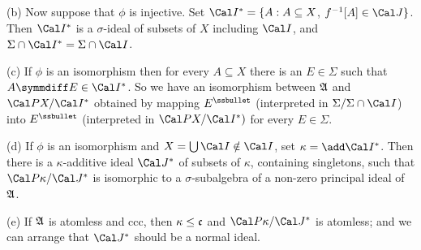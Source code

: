 (b) Now suppose that $\phi$ is injective.   Set
$\Cal I^*=\{A:A\subseteq X$, $f^{-1}[A]\in\Cal J\}$.  Then $\Cal I^*$ is a
$\sigma$-ideal of subsets of $X$ including $\Cal I$,
and $\Sigma\cap\Cal I^*=\Sigma\cap\Cal I$.

(c) If $\phi$ is an isomorphism then for every $A\subseteq X$ there is an
$E\in\Sigma$ such that $A\symmdiff E\in\Cal I^*$.   So
we have an isomorphism between
$\frak A$ and $\Cal PX/\Cal I^*$ obtained by mapping $E^{\ssbullet}$
(interpreted in $\Sigma/\Sigma\cap\Cal I$) into $E^{\ssbullet}$
(interpreted in $\Cal PX/\Cal I^*)$ for every $E\in\Sigma$.

(d) If $\phi$ is an isomorphism and $X=\bigcup\Cal I\notin\Cal I$,
set $\kappa=\add\Cal I^*$.
Then there is a $\kappa$-additive ideal $\Cal J^*$
of subsets of $\kappa$, containing singletons,
such that $\Cal P\kappa/\Cal J^*$ is isomorphic to a
$\sigma$-subalgebra of a non-zero principal ideal of $\frak A$.

(e) If $\frak A$ is atomless and ccc,
then $\kappa\le\frak c$ and $\Cal P\kappa/\Cal J^*$ is atomless;
and we can arrange that $\Cal J^*$ should be a normal ideal.

